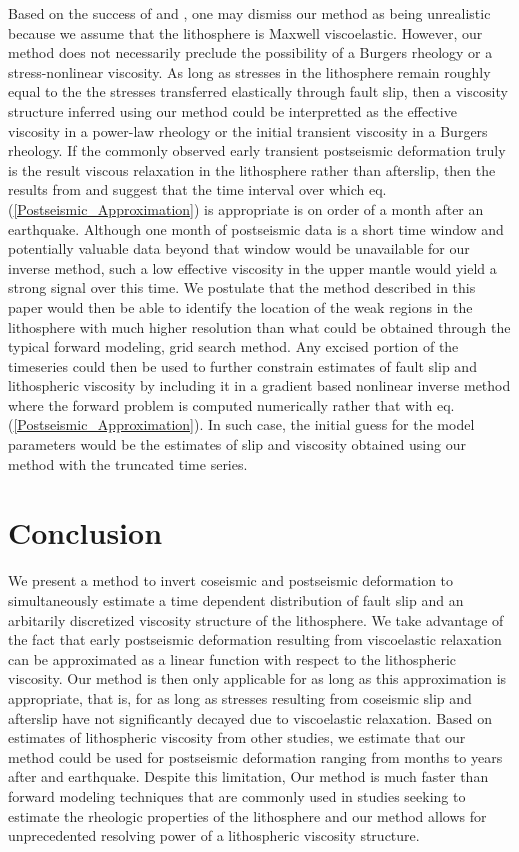 \documentclass[extra,mreferee]{gji}
\begin{document}
Based on the success of \citet{P2003,P2005} and \citet{F2006b}, one
may dismiss our method as being unrealistic because we assume that the
lithosphere is Maxwell viscoelastic.  However, our method does not
necessarily preclude the possibility of a Burgers rheology or a
stress-nonlinear viscosity.  As long as stresses in the lithosphere
remain roughly equal to the the stresses transferred elastically
through fault slip, then a viscosity structure inferred using our
method could be interpretted as the effective viscosity in a power-law
rheology or the initial transient viscosity in a Burgers rheology.  If
the commonly observed early transient postseismic deformation truly is
the result viscous relaxation in the lithosphere rather than afterslip,
then the results from \citet{P2003,P2005} and \citet{F2006b} suggest
that the time interval over which
eq. (\ref{Postseismic_Approximation}) is appropriate is on order of a
month after an earthquake.  Although one month of postseismic data is
a short time window and potentially valuable data beyond that window
would be unavailable for our inverse method, such a low
effective viscosity in the upper mantle would yield a strong signal
over this time.  We postulate that the method described in this paper
would then be able to identify the location of the weak regions in the
lithosphere with much higher resolution than what could be obtained
through the typical forward modeling, grid search method.  Any excised
portion of the timeseries could then be used to further constrain
estimates of fault slip and lithospheric viscosity by including it in
a gradient based nonlinear inverse method where the forward problem is
computed numerically rather that with
eq. (\ref{Postseismic_Approximation}). In such case, the initial guess
for the model parameters would be the estimates of slip and viscosity
obtained using our method with the truncated time series.  

\section{Conclusion}
We present a method to invert coseismic and postseismic deformation to
simultaneously estimate a time dependent distribution of fault slip
and an arbitarily discretized viscosity structure of the lithosphere.
We take advantage of the fact that early postseismic deformation
resulting from viscoelastic relaxation can be approximated as a linear
function with respect to the lithospheric viscosity.  Our method is
then only applicable for as long as this approximation is appropriate,
that is, for as long as stresses resulting from coseismic slip and
afterslip have not significantly decayed due to viscoelastic
relaxation.  Based on estimates of lithospheric viscosity from other
studies, we estimate that our method could be used for postseismic
deformation ranging from months to years after and earthquake.
Despite this limitation, Our method is much faster than forward
modeling techniques that are commonly used in studies seeking to
estimate the rheologic properties of the lithosphere and our method
allows for unprecedented resolving power of a lithospheric viscosity
structure.
\end{document}
